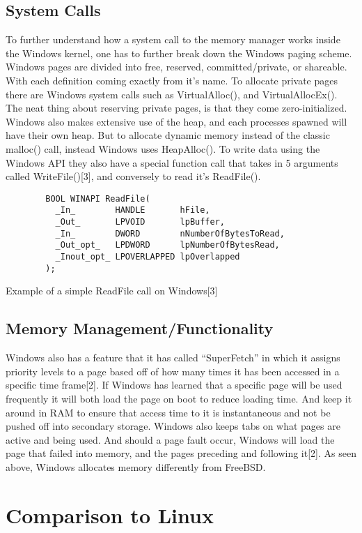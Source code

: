 \documentclass{article}
\begin{document}
\subsection{System Calls}
		To further understand how a system call to the memory manager works inside the Windows kernel, one has to further break down the Windows paging scheme. Windows pages are divided into free, reserved, committed/private, or shareable.  With each definition coming exactly from it’s name. To allocate private pages there are Windows system calls such as VirtualAlloc(), and VirtualAllocEx(). The neat thing about reserving private pages, is that they come zero-initialized. Windows also makes extensive use of the heap, and each processes spawned will have their own heap. But to allocate dynamic memory instead of the classic malloc() call, instead Windows uses HeapAlloc(). To write data using the Windows API they also have a special function call that takes in 5 arguments called WriteFile()[3], and conversely to read it’s ReadFile().

		\begin{lstlisting}
		BOOL WINAPI ReadFile(
          _In_        HANDLE       hFile,
          _Out_       LPVOID       lpBuffer,
          _In_        DWORD        nNumberOfBytesToRead,
          _Out_opt_   LPDWORD      lpNumberOfBytesRead,
          _Inout_opt_ LPOVERLAPPED lpOverlapped
        );

		\end{lstlisting}
		Example of a simple ReadFile call on Windows[3]



\subsection{Memory Management/Functionality}
        Windows also has a feature that it has called “SuperFetch” in which it assigns priority levels to a page based off of how many times it has been accessed in a specific time frame[2]. If Windows has learned that  a specific page will be used frequently it will both load the page on boot to reduce loading time. And keep it around in RAM to ensure that access time to it is instantaneous and not be pushed off into secondary storage. Windows also keeps tabs on what pages are active and being used. And should a page fault occur, Windows will load the page that failed into memory, and the pages preceding and following it[2]. As seen above, Windows allocates memory differently from FreeBSD.

\section{Comparison to Linux}
\end{document}
